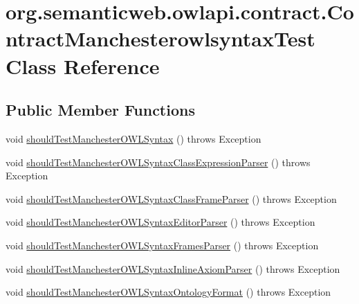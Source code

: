 \hypertarget{classorg_1_1semanticweb_1_1owlapi_1_1contract_1_1_contract_manchesterowlsyntax_test}{\section{org.\-semanticweb.\-owlapi.\-contract.\-Contract\-Manchesterowlsyntax\-Test Class Reference}
\label{classorg_1_1semanticweb_1_1owlapi_1_1contract_1_1_contract_manchesterowlsyntax_test}
}
\subsection*{Public Member Functions}
\begin{DoxyCompactItemize}
\item 
void \hyperlink{classorg_1_1semanticweb_1_1owlapi_1_1contract_1_1_contract_manchesterowlsyntax_test_a725bafedffc7e0641397e43b0d6d51f1}{should\-Test\-Manchester\-O\-W\-L\-Syntax} ()  throws Exception 
\item 
void \hyperlink{classorg_1_1semanticweb_1_1owlapi_1_1contract_1_1_contract_manchesterowlsyntax_test_aa4ebe55dc4d54d784095d20bbe2b176d}{should\-Test\-Manchester\-O\-W\-L\-Syntax\-Class\-Expression\-Parser} ()  throws Exception 
\item 
void \hyperlink{classorg_1_1semanticweb_1_1owlapi_1_1contract_1_1_contract_manchesterowlsyntax_test_a927e7b9005bd8b14fb0a2ec6be3e3365}{should\-Test\-Manchester\-O\-W\-L\-Syntax\-Class\-Frame\-Parser} ()  throws Exception 
\item 
void \hyperlink{classorg_1_1semanticweb_1_1owlapi_1_1contract_1_1_contract_manchesterowlsyntax_test_af6cd192a866a5997001a8a6c58f64bf9}{should\-Test\-Manchester\-O\-W\-L\-Syntax\-Editor\-Parser} ()  throws Exception 
\item 
void \hyperlink{classorg_1_1semanticweb_1_1owlapi_1_1contract_1_1_contract_manchesterowlsyntax_test_afed9a5b904e2a41f787e6da6e3ecc6ea}{should\-Test\-Manchester\-O\-W\-L\-Syntax\-Frames\-Parser} ()  throws Exception 
\item 
void \hyperlink{classorg_1_1semanticweb_1_1owlapi_1_1contract_1_1_contract_manchesterowlsyntax_test_a08936223e8d5ff181f89263756e78e1a}{should\-Test\-Manchester\-O\-W\-L\-Syntax\-Inline\-Axiom\-Parser} ()  throws Exception 
\item 
void \hyperlink{classorg_1_1semanticweb_1_1owlapi_1_1contract_1_1_contract_manchesterowlsyntax_test_aaa14a70f070bdcdf5318717c000c4686}{should\-Test\-Manchester\-O\-W\-L\-Syntax\-Ontology\-Format} ()  throws Exception 

\end{DoxyCompactItemize}
